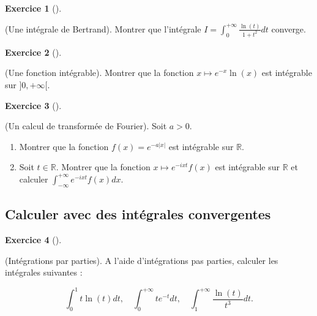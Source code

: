 \documentclass[
  french,
  letterpaper,
  DIV=11,
  numbers=noendperiod]{scrreprt}
\theoremstyle{plain}
\theoremstyle{definition}
\theoremstyle{plain}
\theoremstyle{plain}
\theoremstyle{definition}
\newtheorem{exercise}{Exercice}[chapter]
\theoremstyle{definition}
\theoremstyle{plain}
\theoremstyle{remark}
\begin{document}
\begin{exercise}[]\protect\hypertarget{exr-01-bertrand}{}\label{exr-01-bertrand}

(Une intégrale de Bertrand). Montrer que l'intégrale
\(I = \displaystyle \int_0^{+\infty}\frac{\ln(t)}{1+t^2}dt\) converge.

\end{exercise}

\begin{exercise}[]\protect\hypertarget{exr-01-integrable}{}\label{exr-01-integrable}

(Une fonction intégrable). Montrer que la fonction
\(x\mapsto e^{-x}\ln(x)\) est intégrable sur \(]0,+\infty[\).

\end{exercise}

\begin{exercise}[]\protect\hypertarget{exr-01-integrable-fourier}{}\label{exr-01-integrable-fourier}

(Un calcul de transformée de Fourier). Soit \(a>0\).

\begin{enumerate}
\def\labelenumi{\arabic{enumi}.}
\item
  Montrer que la fonction \(f(x) = e^{-a|x|}\) est intégrable sur
  \(\mathbb{R}\).
\item
  Soit \(t\in\mathbb{R}\). Montrer que la fonction
  \(x\mapsto e^{-ixt}f(x)\) est intégrable sur \(\mathbb{R}\) et
  calculer \(\displaystyle \int_{-\infty}^{+\infty}e^{-ixt}f(x)dx\).
\end{enumerate}

\end{exercise}

\subsection{Calculer avec des intégrales
convergentes}\label{calculer-avec-des-intuxe9grales-convergentes}

\begin{exercise}[]\protect\hypertarget{exr-01-ipp}{}\label{exr-01-ipp}

(Intégrations par parties). A l'aide d'intégrations pas parties,
calculer les intégrales suivantes :

\[
\displaystyle\int_0^1 t\ln(t)dt,\quad \displaystyle\int_0^{+\infty} te^{-t}dt,\quad \displaystyle\int_1^{+\infty}\frac{\ln(t)}{t^3}dt.
\]

\end{exercise}
\end{document}
